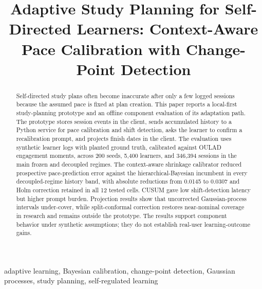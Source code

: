 \documentclass[conference]{IEEEtran}
\begin{document}
\title{Adaptive Study Planning for Self-Directed Learners: Context-Aware Pace Calibration with Change-Point Detection}

\author{
\and
{}
}

\maketitle

\begin{abstract}
Self-directed study plans often become inaccurate after only a few logged sessions because the assumed pace is fixed at plan creation. This paper reports a local-first study-planning prototype and an offline component evaluation of its adaptation path. The prototype stores session events in the client, sends accumulated history to a Python service for pace calibration and shift detection, asks the learner to confirm a recalibration prompt, and projects finish dates in the client. The evaluation uses synthetic learner logs with planted ground truth, calibrated against OULAD engagement moments, across 200 seeds, 5{,}400 learners, and 346{,}394 sessions in the main frozen and decoupled regimes. The context-aware shrinkage calibrator reduced prospective pace-prediction error against the hierarchical-Bayesian incumbent in every decoupled-regime history band, with absolute reductions from 0.0145 to 0.0307 and Holm correction retained in all 12 tested cells. CUSUM gave low shift-detection latency but higher prompt burden. Projection results show that uncorrected Gaussian-process intervals under-cover, while split-conformal correction restores near-nominal coverage in research and remains outside the prototype. The results support component behavior under synthetic assumptions; they do not establish real-user learning-outcome gains.
\end{abstract}

\begin{IEEEkeywords}
adaptive learning, Bayesian calibration, change-point detection, Gaussian processes, study planning, self-regulated learning
\end{IEEEkeywords}
\end{document}
